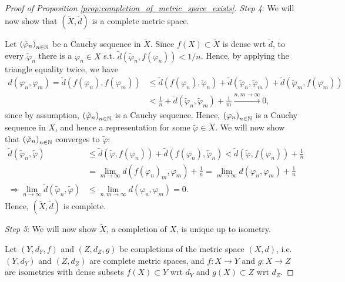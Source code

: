 \begin{proof}[Proof of Proposition \ref{prop:completion_of_metric_space_exists}]
	\textit{Step 4}: We will now show that $\left(\tilde{X}, \tilde{d}\right)$ is a complete metric space.
	
	Let $\seq[\tilde{\varphi}_n]$ be a Cauchy sequence in $\tilde{X}$. Since $f(X)\subset \tilde{X}$ is dense wrt $\tilde{d}$, to every $\tilde{\varphi}_n$ there is a $\varphi_n\in X$ s.t. $\tilde{d}\left(\tilde{\varphi}_n, f(\varphi_n)\right) < 1/n$. Hence, by applying the triangle equality twice, we have
	\begin{align}
		d(\varphi_n, \varphi_m) = \tilde{d}\left(f(\varphi_n), f(\varphi_m)\right) &\leq \tilde{d}\left(f(\varphi_n), \tilde{\varphi}_n\right) + \tilde{d}\left(\tilde{\varphi}_{n}, \tilde{\varphi}_m\right) + \tilde{d}\left(\tilde{\varphi}_m, f(\varphi_m)\right)
		\\ &< \frac{1}{n} + \tilde{d}\left(\tilde{\varphi}_n, \tilde{\varphi}_m\right) + \frac{1}{m} \overset{n, m\to\infty}{\longrightarrow} 0,
	\end{align}
	since by assumption, $\seq[\tilde{\varphi}_n]$ is a Cauchy sequence. Hence, $\seq[\varphi_n]$ is a Cauchy sequence in $X$, and hence a representation for some $\tilde{\varphi}\in\tilde{X}$. We will now show that $\seq[\tilde{\varphi}_n]$ converges to $\tilde{\varphi}$:
	\begin{align}
		\tilde{d}\left(\tilde{\varphi}_n, \tilde{\varphi}\right) &\leq \tilde{d}\left(\tilde{\varphi}, f(\varphi_n)\right) + \tilde{d}\left( f(\varphi_n), \tilde{\varphi}_n \right) < \tilde{d}\left(\tilde{\varphi}, f(\varphi_n)\right) + \frac{1}{n} 
		\\  &= \lim\limits_{m\to\infty} d\left(f(\varphi_n)_m, \varphi_m\right) + \frac{1}{n} = \lim\limits_{m\to\infty} d\left(\varphi_n, \varphi_m\right) + \frac{1}{n} 
		\\ \Rightarrow \lim\limits_{n\to\infty}\tilde{d}\left(\tilde{\varphi}_n, \tilde{\varphi}\right) &\leq \lim\limits_{n, m\to\infty} d(\varphi_n, \varphi_m) = 0.
	\end{align}
	Hence, $\left(\tilde{X}, \tilde{d}\right)$ is complete.
	
	\textit{Step 5}: We will now show $\tilde{X}$, a completion of $X$, is unique up to isometry.
	
	Let $(Y, d_Y, f)$ and $(Z, d_Z, g)$ be completions of the metric space $(X, d)$, i.e. $(Y, d_Y)$ and $(Z, d_Z)$ are complete metric spaces, and $f: X\to Y$ and $g: X\to Z$ are isometries with dense subsets $f(X)\subset Y$ wrt $d_Y$ and $g(X)\subset Z$ wrt $d_Z$.
	

\end{proof}
